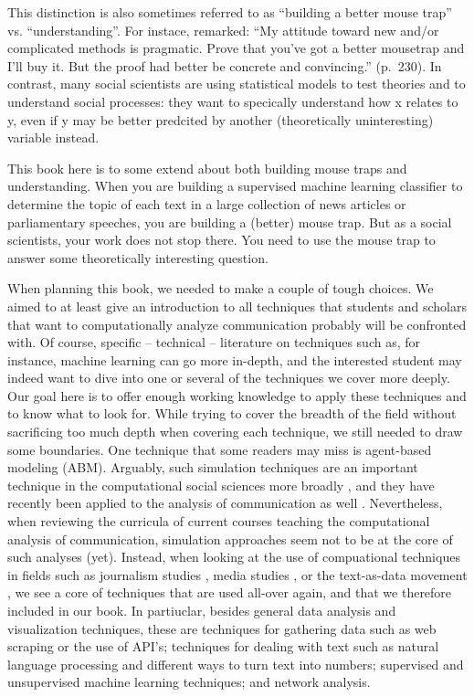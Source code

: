 This distinction is also sometimes referred to as ``building a better
mouse trap'' vs. ``understanding''. For instace, \cite{Breiman2001}
remarked: ``My attitude toward new and/or complicated methods is
pragmatic. Prove that you've got a better mousetrap and I'll buy
it. But the proof had better be concrete and convincing.''
(p.~230).
In contrast, many social scientists are using statistical
models to test theories and to understand social processes: they want
to specically understand how x relates to y, even if y may be better
predcited by another (theoretically uninteresting) variable instead.

This book here is to some extend about both building mouse traps and understanding. When you
are building a supervised machine learning classifier to determine the
topic of each text in a large collection of news articles or
parliamentary speeches, you are building a (better) mouse trap. But as
a social scientists, your work does not stop there. You need to use
the mouse trap to answer some theoretically interesting question.



When planning this book, we needed to make a couple of tough
choices. We aimed to at least give an introduction to all techniques
that students and scholars that want to computationally analyze
communication probably will be confronted with. Of course, specific --
technical -- literature on techniques such as, for instance, machine
learning can go more in-depth, and the interested student may indeed
want to dive into one or several of the techniques we cover more
deeply. Our goal here is to offer enough working knowledge to apply
these techniques and to know what to look for.  While trying to cover
the breadth of the field without sacrificing too much depth when
covering each technique, we still needed to draw some boundaries. One
technique that some readers may miss is agent-based modeling
(ABM). Arguably, such simulation techniques are an important technique
in the computational social sciences more broadly
\citep{cioffi-revilla2014}, and they have recently been applied to the
analysis of communication as well
\citep{Waldherr2014,Wettstein2020}. Nevertheless, when reviewing the
curricula of current courses teaching the computational analysis of
communication, simulation approaches seem not to be at the core of
such analyses (yet).  Instead, when looking at the use of compuational
techniques in fields such as journalism studies
\citep[e.g.,][]{Boumans2016}, media studies \citep[e.g.,][]{Rieder2017}, or
the text-as-data movement \citep{Grimmer2013}, we see a core of
techniques that are used all-over again, and that we therefore
included in our book. In partiuclar, besides general data analysis and visualization techniques,
these are techniques for
gathering data such as web scraping or the use of API's; techniques
for dealing with text such as natural language processing and
different ways to turn text into numbers; supervised and unsupervised
machine learning techniques; and network analysis.




